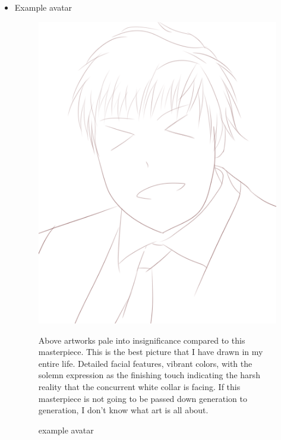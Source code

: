 \documentclass[11pt]{article}
\begin{document}
\begin{spacing}{1.0}
\begin{itemize}
	
	\item Example avatar
	\begin{figure}[H]
		\centering
		\includegraphics[scale=.5]{figures/png/example_avatar.png}
		\caption{example avatar}
		
	Above artworks pale into insignificance compared to this masterpiece. This is the best picture that I have drawn in my entire life. Detailed facial features, vibrant colors, with the solemn expression as the finishing touch indicating the harsh reality that the concurrent white collar is facing. If this masterpiece is not going to be passed down generation to generation, I don't know what art is all about.

	\end{figure}	
	
	
	\end{itemize}
	
	

\end{spacing}
\end{document}

